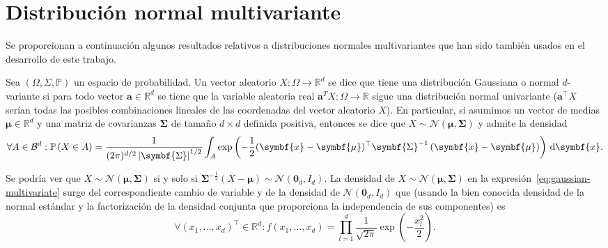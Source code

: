 \section{Distribución normal multivariante}

Se proporcionan a continuación algunos resultados relativos a
distribuciones normales multivariantes que han sido también usados en
el desarrollo de este trabajo.


\begin{definition}
	Sea $\left(\Omega,\Sigma,\mathbb{P}\right)$ un espacio de
	probabilidad.
	Un vector aleatorio $X\colon\Omega\to\mathbb{R}^{d}$ se dice que
	tiene una distribución Gaussiana o normal $d$-variante si para todo
	vector $\symbf{a}\in\mathbb{R}^{d}$ se tiene que la variable
	aleatoria real $\symbf{a}^{T}X\colon\Omega\to\mathbb{R}$ sigue una
	distribución normal univariante ($\symbf{a}^{\top}X$ serían todas
	las posibles combinaciones lineales de las coordenadas del vector
	aleatorio $X$).
	En particular, si asumimos un vector de medias
	$\symbf{\mu}\in\mathbb{R}^{d}$ y una matriz de covarianzas
	$\symbf{\Sigma}$ de tamaño $d \times d$ definida positiva, entonces
	se dice que
	$X\sim\mathcal{N}\left(\symbf{\mu},\symbf{\Sigma}\right)$ y admite
	la densidad
	\begin{equation}\label{eq:gaussian-multivariate}
		\forall A\in\mathcal{B}^{d}:
		\mathbb{P}\left(X\in A\right)=
		\frac{1}{(2\pi)^{d/2}
			\left|\symbf{\Sigma}\right|^{1/2}}
		\int_{A}
		\exp
		\left(
		-\frac{1}{2}(\symbf{x}-\symbf{\mu})^\top\symbf{\Sigma}^{-1}
		\left(\symbf{x}-\symbf{\mu}\right)
		\right)
		\dl{\symbf{x}}.
	\end{equation}
\end{definition}

Se podría ver que
$X\sim\mathcal{N}\left(\symbf{\mu},\symbf{\Sigma}\right)$ si y solo
si
\begin{math}
	\symbf{\Sigma}^{-\frac{1}{2}}
	\left(X-\symbf{\mu}\right)\sim
	\mathcal{N}
	\left(\symbf{0}_{d},I_{d}\right)
\end{math}.
La densidad de
$X\sim\mathcal{N}\left(\symbf{\mu},\symbf{\Sigma}\right)$
en la expresión~\eqref{eq:gaussian-multivariate} surge del
correspondiente cambio de variable y de la densidad de
$\mathcal{N}\left(\symbf{0}_{d},I_{d}\right)$ que (usando la bien
conocida densidad de la normal estándar y la factorización de la
densidad conjunta que proporciona la independencia de sus
componentes) es
\begin{equation*}
	\forall{\left(x_{1},\dotsc,x_{d}\right)}^{\top}\in\mathbb{R}^{d}:
	f\left(x_{1},\dotsc,x_{d}\right)=
	\prod_{l=1}^{d}
	\frac{1}{\sqrt{2\pi}}
	\exp\left(-\frac{x_{l}^{2}}{2}\right).
\end{equation*}

